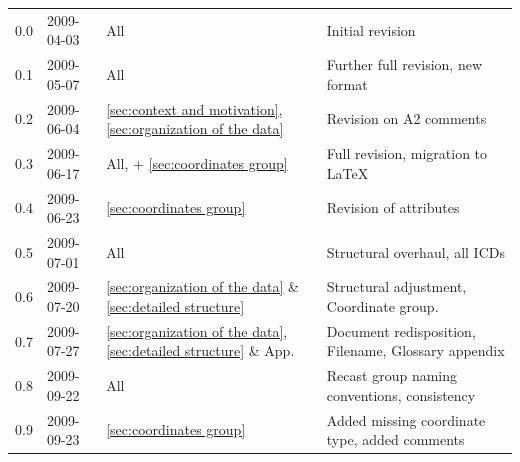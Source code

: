 \documentclass[a4paper,10pt,bibtotoc]{scrartcl}
\begin{document}
\begin{center}
  \tablelasttail{\hline}
  \begin{supertabular}{lllp{9.5cm}}
    \shrinkheight{-3em}

    0.0  & 2009-04-03 & All & Initial revision \\

    0.1  & 2009-05-07 & All & Further full revision, new format \\

    0.2  & 2009-06-04 & \ref{sec:context and motivation},
    \ref{sec:organization of the data} & Revision on A2 comments \\

    0.3  & 2009-06-17 & All, + \ref{sec:coordinates group} & Full revision,
    migration to \LaTeX \\

    0.4  & 2009-06-23 & \ref{sec:coordinates group} & Revision of attributes \\

    0.5  & 2009-07-01 & All & Structural overhaul, all ICDs \\

    0.6  & 2009-07-20 & \ref{sec:organization of the data} \& \ref{sec:detailed
    structure} & Structural adjustment, Coordinate group. \\

    0.7  & 2009-07-27 & \ref{sec:organization of the data}, \ref{sec:detailed
    structure} \& App. & Document redisposition, Filename, Glossary appendix \\

    0.8  & 2009-09-22 & All & Recast group naming conventions, consistency \\

    0.9  & 2009-09-23 & \ref{sec:coordinates group} & Added missing coordinate
    type, added comments \\


\end{supertabular}
\end{center}
\end{document}
